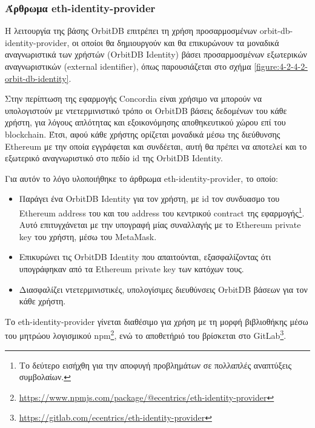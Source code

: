 \subsubsection{Άρθρωμα eth-identity-provider} \label{subsubsection:4-3-1-eth-identity-provider-unit}

Η λειτουργία της βάσης OrbitDB επιτρέπει τη χρήση προσαρμοσμένων  orbit-db-identity-provider, οι οποίοι θα δημιουργούν και θα επικυρώνουν
τα μοναδικά αναγνωριστικά των χρήστών (OrbitDB Identity) βάσει προσαρμοσμένων εξωτερικών αναγνωριστικών (external identifier), όπως παρουσιάζεται στο σχήμα \ref{figure:4-2-4-2-orbit-db-identity}.

Στην περίπτωση της εφαρμογής Concordia είναι χρήσιμο να μπορούν να υπολογιστούν με ντετερμινιστικό τρόπο οι OrbitDB βάσεις δεδομένων του κάθε χρήστη, για λόγους απλότητας και εξοικονόμησης αποθηκευτικού χώρου επί του blockchain. Έτσι, αφού κάθε χρήστης ορίζεται μοναδικά μέσω της διεύθυνσης Ethereum με την οποία εγγράφεται και συνδέεται, αυτή θα πρέπει να αποτελεί και το εξωτερικό αναγνωριστικό στο πεδίο id της OrbitDB Identity.

Για αυτόν το λόγο υλοποιήθηκε το άρθρωμα eth-identity-provider, το οποίο:

\begin{itemize}
	\item Παράγει ένα OrbitDB Identity για τον χρήστη, με id τον συνδυασμο του Ethereum address του και του address του κεντρικού contract της εφαρμογής\footnote{Το δεύτερο εισήχθη για την αποφυγή προβλημάτων σε πολλαπλές αναπτύξεις συμβολαίων.}. Αυτό επιτυγχάνεται με την υπογραφή μίας συναλλαγής με το Ethereum private key του χρήστη, μέσω του MetaMask.
	\item Επικυρώνει τις OrbitDB Identity που απαιτούνται, εξασφαλίζοντας ότι υπογράφηκαν από τα Ethereum private key των κατόχων τους. 
	\item Διασφαλίζει ντετερμινιστικές, υπολογίσιμες διευθύνσεις OrbitDB βάσεων για τον κάθε χρήστη.
\end{itemize}

Το eth-identity-provider γίνεται διαθέσιμο για χρήση με τη μορφή βιβλιοθήκης μέσω του μητρώου λογισμικού npm\footnote{\url{https://www.npmjs.com/package/@ecentrics/eth-identity-provider}}, ενώ το αποθετήριό του βρίσκεται στο GitLab\footnote{\url{https://gitlab.com/ecentrics/eth-identity-provider}}.
